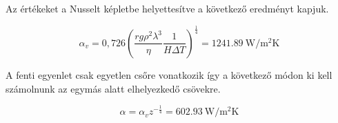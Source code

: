 \noindent Az értékeket a Nusselt képletbe helyettesítve a következő eredményt kapjuk.

\begin{equation}
\alpha_{v}=0,726\left(\dfrac{r g \rho^2 \lambda^3 }{\eta}\dfrac{1}{H \Delta T} \right)^\tfrac{1}{4}=\SI{1241,89}{\watt\per\meter\squared\kelvin}
\end{equation} 

\noindent A fenti egyenlet csak egyetlen csőre vonatkozik így a következő módon ki kell számolnunk az egymás alatt elhelyezkedő csövekre.

\begin{equation}
\alpha=\alpha_{v} z^{-\tfrac{1}{4}}=\SI{602,93}{\watt\per\meter\squared\kelvin}
\end{equation} 